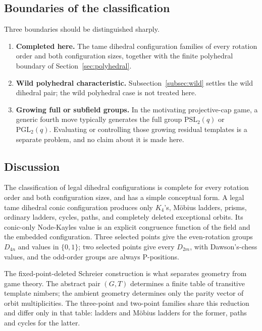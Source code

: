 \documentclass[11pt]{article}
\theoremstyle{definition}
\theoremstyle{remark}
\newcommand{\PGL}{\mathrm{PGL}}
\newcommand{\PSL}{\mathrm{PSL}}
\newif\ifdraftnotes
\newcommand{\phasenote}[2]{%
  \ifdraftnotes
    \par\smallskip\noindent
    \fbox{\parbox{0.96\linewidth}{\footnotesize\textbf{[#1 owed]}\ #2}}%
    \par\smallskip
  \fi}
\begin{document}
\phasenote{C307}{Fable's change~3: this wild result is the paper's sharpest boundary marker and
should be presented as such rather than as an aside. Whether to promote it from remark to a numbered
lemma is a user scope call; C283 judged it a short lemma and the default is the remark as landed.}

\subsection{Boundaries of the classification}

Three boundaries should be distinguished sharply.

\begin{enumerate}[label=(\arabic*)]
  \item \textbf{Completed here.} The tame dihedral configuration families of every rotation order
    and both configuration sizes, together with the finite polyhedral boundary of
    Section~\ref{sec:polyhedral}.
  \item \textbf{Wild polyhedral characteristic.} Subsection~\ref{subsec:wild} settles the wild
    dihedral pair; the wild polyhedral case is not treated here.
  \item \textbf{Growing full or subfield groups.} In the motivating projective-cap game, a generic
    fourth move typically generates the full group $\PSL_2(q)$ or $\PGL_2(q)$. Evaluating or
    controlling those growing residual templates is a separate problem, and no claim about it is
    made here.
\end{enumerate}

\subsection{Discussion}

The classification of legal dihedral configurations is complete for every rotation order and both
configuration sizes, and has a simple conceptual form. A legal tame dihedral conic configuration
produces only $K_4$'s, Möbius ladders, prisms, ordinary ladders, cycles, paths, and completely
deleted exceptional orbits. Its conic-only Node-Kayles value is an explicit congruence function of
the field and the embedded configuration. Three selected points give the even-rotation groups
$D_{4n}$ and values in $\{0,1\}$; two selected points give every $D_{2m}$, with Dawson's-chess
values, and the odd-order groups are always P-positions.

The fixed-point-deleted Schreier construction is what separates geometry from game theory. The
abstract pair $(G,T)$ determines a finite table of transitive template nimbers; the ambient geometry
determines only the parity vector of orbit multiplicities. The three-point and two-point families
share this reduction and differ only in that table: ladders and Möbius ladders for the former, paths
and cycles for the latter.
\end{document}

